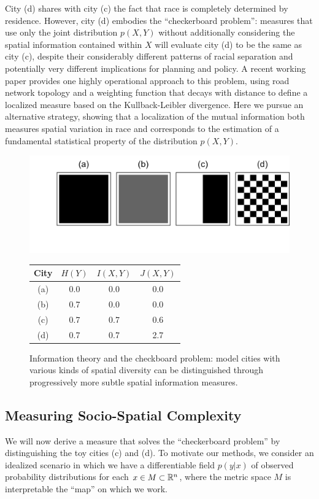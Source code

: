 	City (d) shares with city (c) the fact that race is completely determined by residence. However, city (d) embodies the ``checkerboard problem'': measures that use only the joint distribution $p(X,Y)$ without additionally considering the spatial information contained within $X$ will evaluate city (d) to be the same as city (c), despite their considerably different patterns of racial separation and potentially very different implications for planning and policy. A recent working paper \cite{Roberto2015} provides one highly operational approach to this problem, using road network topology and a weighting function that decays with distance to define a localized measure based on the Kullback-Leibler divergence. Here we pursue an alternative strategy, showing that a localization of the mutual information both measures spatial variation in race and corresponds to the estimation of a fundamental statistical property of the distribution $p(X,Y)$. 

	\begin{figure}
		\centering
		  \includegraphics[width=.7\linewidth]{figs/checkerboard.png}
		  \begin{tabular}{c | c c c}
			  City & $H(Y)$ & $I(X,Y)$ & $J(X,Y)$ \\
			  \hline			
			  (a) & 0.0 & 0.0 & 0.0\\
			  (b) & 0.7 & 0.0 & 0.0\\
			  (c) & 0.7 & 0.7 & 0.6\\
			  (d) & 0.7 & 0.7 & 2.7\\
			  \hline  
			\end{tabular}
		\caption{Information theory and the checkboard problem: model cities with various kinds of spatial diversity can be distinguished through progressively more subtle spatial information measures.}
		\label{fig:toy}
		\end{figure}

\subsection{Measuring Socio-Spatial Complexity}
		We will now derive a measure that solves the ``checkerboard problem'' by distinguishing the toy cities (c) and (d). To motivate our methods, we  consider an idealized scenario in which we have a differentiable field $p(y|x)$ of observed probability distributions for each $x \in M \subset \mathbb{R}^n$, where the metric space $M$ is interpretable the ``map'' on which we work. 

